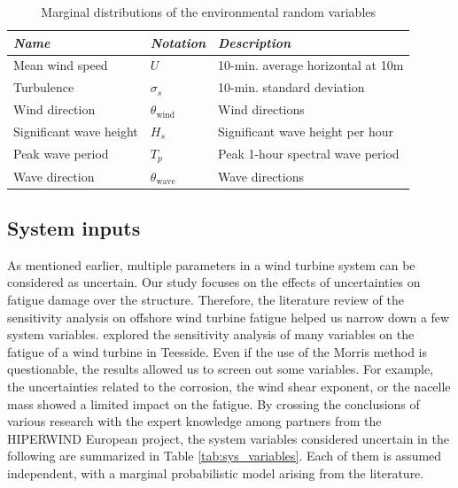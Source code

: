 \begin{table}[h!]
    \centering
    \begin{tabular}{ l l l}
        \hline
        {\it Name} & {\it Notation} & {\it Description}\\
        \hline
        Mean wind speed & $U$ & 10-min. average horizontal at 10m\\
        Turbulence & $\sigma_s $ & 10-min.  standard deviation \\
        Wind direction & $\theta_{\mathrm{wind}} $ & Wind directions\\
        Significant wave height & $H_s $  & Significant wave height per hour\\
        Peak wave period & $T_p $ & Peak 1-hour spectral wave period \\
        Wave direction & $\theta_{\mathrm{wave}} $ & Wave directions\\
        \hline
    \end{tabular}
    \caption{Marginal distributions of the environmental random variables}
    \label{tab:envi_variables}
\end{table}

\subsection{System inputs}
As mentioned earlier, multiple parameters in a wind turbine system can be considered as uncertain. 
Our study focuses on the effects of uncertainties on fatigue damage over the structure. 
Therefore, the literature review of the sensitivity analysis on offshore wind turbine fatigue helped us narrow down a few system variables. 
\citet{petrovska_2022} explored the sensitivity analysis of many variables on the fatigue of a wind turbine in Teesside. 
Even if the use of the Morris method is questionable, the results allowed us to screen out some variables. 
For example, the uncertainties related to the corrosion, the wind shear exponent, or the nacelle mass showed a limited impact on the fatigue.     
By crossing the conclusions of various research with the expert knowledge among partners from the HIPERWIND European project, the system variables considered uncertain in the following are summarized in Table \ref{tab:sys_variables}. 
Each of them is assumed independent, with a marginal probabilistic model arising from the literature. 



